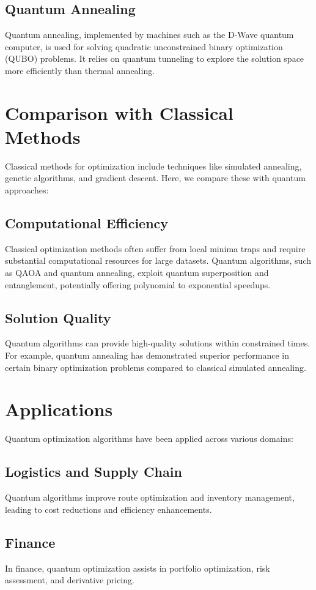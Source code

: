 \documentclass{article}
\begin{document}
\subsection{Quantum Annealing}
Quantum annealing, implemented by machines such as the D-Wave quantum computer, is used for solving quadratic unconstrained binary optimization (QUBO) problems. It relies on quantum tunneling to explore the solution space more efficiently than thermal annealing.

\section{Comparison with Classical Methods}
Classical methods for optimization include techniques like simulated annealing, genetic algorithms, and gradient descent. Here, we compare these with quantum approaches:

\subsection{Computational Efficiency}
Classical optimization methods often suffer from local minima traps and require substantial computational resources for large datasets. Quantum algorithms, such as QAOA and quantum annealing, exploit quantum superposition and entanglement, potentially offering polynomial to exponential speedups.

\subsection{Solution Quality}
Quantum algorithms can provide high-quality solutions within constrained times. For example, quantum annealing has demonstrated superior performance in certain binary optimization problems compared to classical simulated annealing.

\section{Applications}
Quantum optimization algorithms have been applied across various domains:

\subsection{Logistics and Supply Chain}
Quantum algorithms improve route optimization and inventory management, leading to cost reductions and efficiency enhancements.

\subsection{Finance}
In finance, quantum optimization assists in portfolio optimization, risk assessment, and derivative pricing.
\end{document}
